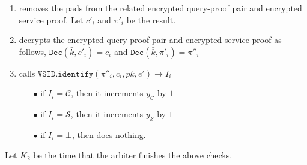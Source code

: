 \begin{enumerate}
\begin{enumerate}
\begin{enumerate}
\item removes the pads from the related encrypted    query-proof pair and encrypted service proof. Let $c'_{\scriptscriptstyle i}$ and $\pi'_{\scriptscriptstyle i}$ be the result. %
\item decrypts the encrypted query-proof pair and encrypted service proof as follows, $ \mathtt{Dec}(\bar{k},c'_{\scriptscriptstyle i})=c_{\scriptscriptstyle i}$ and 
$ \mathtt{Dec}(\bar{k},\pi'_{\scriptscriptstyle i})=\pi''_{\scriptscriptstyle i}$ 
\item\label{arbiter-identify} calls   $\mathtt{VSID.identify}(\pi''_{\scriptscriptstyle i},c_{\scriptscriptstyle i},pk,e')\rightarrow I_{\scriptscriptstyle i}$
\begin{enumerate}
\item[$\bullet$] if $I_{\scriptscriptstyle i}=\mathcal C$, then it increments $y_{\scriptscriptstyle\mathcal C}$ by $1$ 
\item[$\bullet$]  if $I_{\scriptscriptstyle i}=\mathcal S$, then it increments $y_{\scriptscriptstyle\mathcal S}$ by $1$ 
\item[$\bullet$]  if $I_{\scriptscriptstyle i}=\bot$, then does nothing. %
\end{enumerate}
\end{enumerate}

%
%
%
%
Let $K_{\scriptscriptstyle 2}$ be the time that the arbiter finishes the above checks.


\end{enumerate}
\end{enumerate}
